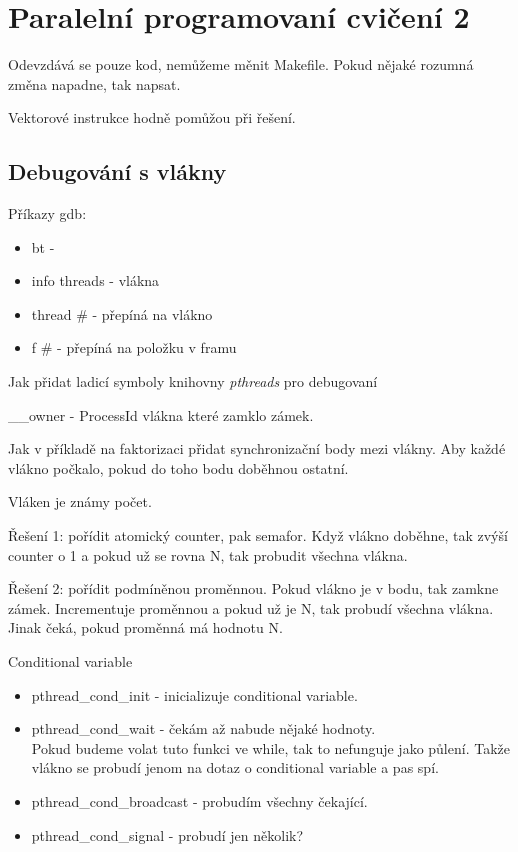 \section{\texorpdfstring{Paralelní programovaní cvičení 2}{Paralelní programovaní cvičení 2}}
\vspace{5mm}
\large

Odevzdává se pouze kod, nemůžeme měnit Makefile.
Pokud nějaké rozumná změna napadne, tak napsat.

Vektorové instrukce hodně pomůžou při řešení.

\subsection{Debugování s vlákny}
Příkazy gdb:
\begin{itemize}
	\item bt -
	\item info threads - vlákna
	\item thread \# - přepíná na vlákno
	\item f \# - přepíná na položku v framu
\end{itemize}

Jak přidat ladicí symboly knihovny \emph{pthreads} pro debugovaní

\_\_owner - ProcessId vlákna které zamklo zámek.

\begin{example}
	Jak v příkladě na faktorizaci přidat synchronizační body mezi vlákny.
	Aby každé vlákno počkalo, pokud do toho bodu doběhnou ostatní.

	Vláken je známy počet.

	Řešení 1: pořídit atomický counter, pak semafor.
	Když vlákno doběhne, tak zvýší counter o 1 a pokud už se rovna N, tak probudit všechna vlákna.

	Řešení 2: pořídit podmíněnou proměnnou.
	Pokud vlákno je v bodu, tak zamkne zámek.
	Incrementuje proměnnou a pokud už je N, tak probudí všechna vlákna.
	Jinak čeká, pokud proměnná má hodnotu N.
\end{example}

Conditional variable
\begin{itemize}
	\item pthread\_cond\_init - inicializuje conditional variable.
	\item pthread\_cond\_wait - čekám až nabude nějaké hodnoty.\\
		Pokud budeme volat tuto funkci ve while, tak to nefunguje jako půlení.
		Takže vlákno se probudí jenom na dotaz o conditional variable a pas spí.

	\item pthread\_cond\_broadcast - probudím všechny čekající.
	\item pthread\_cond\_signal - probudí jen několik?
\end{itemize}

